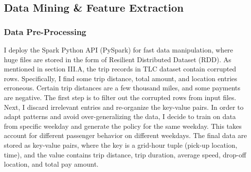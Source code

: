 \documentclass[letterpaper, 10 pt, conference]{ieeeconf}
\begin{document}
\subsection{Data Mining \& Feature Extraction}
\subsubsection{Data Pre-Processing}
I deploy the Spark Python API (PySpark) for fast data manipulation, where huge files are stored in the form of Resilient Distributed Dataset (RDD). As mentioned in section III.A, the trip records in TLC dataset contain corrupted rows. Specifically, I find some trip distance, total amount, and location entries erroneous. Certain trip distances are a few thousand miles, and some payments are negative. The first step is to filter out the corrupted rows from input files. Next, I discard irrelevant entries and re-organize the key-value pairs. In order to adapt patterns and avoid over-generalizing the data, I decide to train on data from specific weekday and generate the policy for the same weekday. This takes account for different passenger behavior on different weekdays. The final data are stored as key-value pairs, where the key is a grid-hour tuple (pick-up location, time), and the value contains trip distance, trip duration, average speed, drop-off location, and total pay amount.
\end{document}
